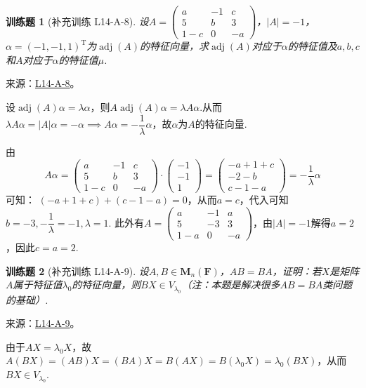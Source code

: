 \documentclass[UTF8,12pt,a4paper,fontset=fandol]{ctexart}
\newtheorem{exercise}{训练题}[section]
\begin{document}
\begin{exercise}[补充训练 L14-A-8]\label{prob:L14-A-8}
设$A=\begin{pmatrix}
                a & -1 & c \\ 5 & b & 3 \\ 1-c & 0 & -a
            \end{pmatrix}$，$|A|=-1$，$\alpha=(-1,-1,1)^\mathrm{T}$为$\operatorname{adj}(A)$的特征向量，求$\operatorname{adj}(A)$对应于$\alpha$的特征值及$a,b,c$和$A$对应于$\alpha$的特征值$\mu$.
\end{exercise}
\noindent 来源：\href{https://github.com/yhwu-is/Linear-Algebra-Left-Undone/blob/new/%E8%AE%B2%E4%B9%89/%E4%B8%93%E9%A2%98/14%20%E7%9B%B8%E4%BC%BC%E6%A0%87%E5%87%86%E5%BD%A2%EF%BC%9A%E5%8A%A8%E6%9C%BA%E4%B8%8E%E5%9F%BA%E7%A1%80.tex}{L14-A-8}。
\begin{solve}
设$\operatorname{adj}(A)\alpha=\lambda \alpha$，则$A\operatorname{adj}(A)\alpha=\lambda A\alpha$.从而$\lambda A\alpha=|A|\alpha=-\alpha\implies A\alpha=-\dfrac{1}{\lambda}\alpha$，故$\alpha$为$A$的特征向量.

            由
\[A\alpha=\begin{pmatrix}
                a & -1 & c \\ 5 & b & 3 \\ 1-c & 0 & -a
            \end{pmatrix}\cdot\begin{pmatrix}
                -1 \\ -1 \\ 1
            \end{pmatrix}=\begin{pmatrix}
                -a+1+c \\ -2-b \\ c-1-a
            \end{pmatrix}=-\dfrac{1}{\lambda}\alpha\]
可知：
            $(-a+1+c)+(c-1-a)=0$，从而$a=c$，代入可知$b=-3,-\dfrac{1}{\lambda}=-1,\lambda=1$.
            此外有$A=\begin{pmatrix}
                a & -1 & a \\ 5 & -3 & 3 \\ 1-a & 0 & -a
            \end{pmatrix}$，由$|A|=-1$解得$a=2$，因此$c=a=2$.
\end{solve}

\begin{exercise}[补充训练 L14-A-9]\label{prob:L14-A-9}
设$A,B\in \mathbf{M}_n(\mathbf{F})$，$AB=BA$，证明：若$X$是矩阵$A$属于特征值$\lambda_0$的特征向量，则$BX\in V_{\lambda_0}$（注：本题是解决很多$AB=BA$类问题的基础）.
\end{exercise}
\noindent 来源：\href{https://github.com/yhwu-is/Linear-Algebra-Left-Undone/blob/new/%E8%AE%B2%E4%B9%89/%E4%B8%93%E9%A2%98/14%20%E7%9B%B8%E4%BC%BC%E6%A0%87%E5%87%86%E5%BD%A2%EF%BC%9A%E5%8A%A8%E6%9C%BA%E4%B8%8E%E5%9F%BA%E7%A1%80.tex}{L14-A-9}。
\begin{solve}
由于$AX=\lambda_0 X$，故$A(BX)=(AB)X=(BA)X=B(AX)=B(\lambda_0X)=\lambda_0(BX)$，从而$BX\in V_{\lambda_0}$.
\end{solve}
\end{document}
